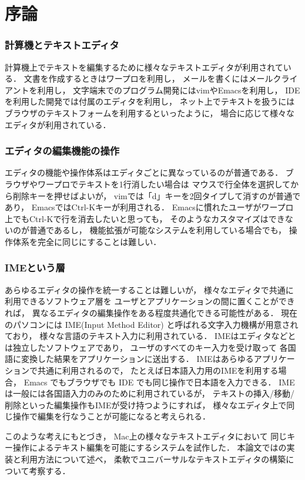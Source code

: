 \chapter{序論}
\label{chap:introduction}

\subsection{計算機とテキストエディタ}
計算機上でテキストを編集するために様々なテキストエディタが利用されている．
文書を作成するときはワープロを利用し，
メールを書くにはメールクライアントを利用し，
文字端末でのプログラム開発にはvimやEmacsを利用し，
IDEを利用した開発では付属のエディタを利用し，
ネット上でテキストを扱うにはブラウザのテキストフォームを利用するといったように，
場合に応じて様々なエディタが利用されている．

\subsection{エディタの編集機能の操作}
エディタの機能や操作体系はエディタごとに異なっているのが普通である．
ブラウザやワープロでテキストを1行消したい場合は
マウスで行全体を選択してから削除キーを押せばよいが，
vimでは「d」キーを2回タイプして消すのが普通であり，
EmacsではCtrl-Kキーが利用される．
Emacsに慣れたユーザがワープロ上でもCtrl-Kで行を消去したいと思っても，
そのようなカスタマイズはできないのが普通であるし，
機能拡張が可能なシステムを利用している場合でも，
操作体系を完全に同じにすることは難しい．

\subsection{IMEという層}
あらゆるエディタの操作を統一することは難しいが，
様々なエディタで共通に利用できるソフトウェア層を
ユーザとアプリケーションの間に置くことができれば，
異なるエディタの編集操作をある程度共通化できる可能性がある．
%
現在のパソコンには IME(Input Method Editor) と呼ばれる文字入力機構が用意されており，
様々な言語のテキスト入力に利用されている．
IMEはエディタなどとは独立したソフトウェアであり，
ユーザのすべてのキー入力を受け取って
各国語に変換した結果をアプリケーションに送出する．
IMEはあらゆるアプリケーションで共通に利用されるので，
たとえば日本語入力用のIMEを利用する場合，
Emacs でもブラウザでも IDE でも同じ操作で日本語を入力できる．
IMEは一般には各国語入力のみのために利用されているが，
テキストの挿入/移動/削除といった編集操作もIMEが受け持つようにすれば，
様々なエディタ上で同じ操作で編集を行なうことが可能になると考えられる．

このような考えにもとづき，
Mac上の様々なテキストエディタにおいて
同じキー操作によるテキスト編集を可能にする{\system}システムを試作した．
本論文では{\system}の実装と利用方法について述べ，
柔軟でユニバーサルなテキストエディタの構築について考察する．

